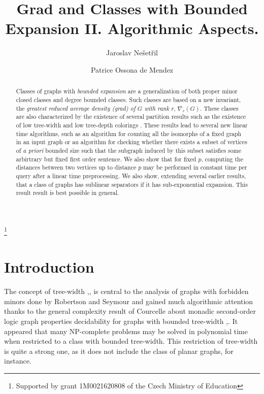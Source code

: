\documentclass[a4paper]{amsart}
\theoremstyle{definition}
\theoremstyle{remark}
\newcommand{\rdens}[1]{\nabla_{#1}}
\begin{document}
\title{Grad  and Classes with Bounded Expansion II. Algorithmic Aspects.}
\author{Jaroslav Ne\v
  set\v ril}
\thanks{Supported by grant 1M0021620808 of the Czech Ministry of Education}
\address{Department of Applied Mathematics\\
  and\\
  Institute of Theoretical Computer Science (ITI)\\
  Charles University\\
  Malostransk\' e n\' am.25, 11800 Praha 1\\
  Czech Republic}  \author{Patrice
  Ossona de Mendez}
\address{Centre d'Analyse et de Math\'ematiques Sociales\\
  CNRS, UMR 8557\\
  54 Bd Raspail, 75006 Paris\\
  France} 
\begin{abstract}
Classes of graphs with {\em bounded expansion} are a
generalization of both proper minor closed classes and degree bounded
classes. Such classes are based on a new invariant, the
{\em greatest reduced average density (grad) of $G$ with rank $r$},
$\rdens{r}(G)$. These classes are also characterized by the existence of several
partition results such as the existence of low tree-width and low
tree-depth colorings \cite{ICGT05}\cite{POMNI}. 
These results lead to several new linear time
algorithms, such as an algorithm for counting all the isomorphs of a
fixed graph in an 
input graph or an algorithm for checking whether there exists a subset
of vertices of 
{\em a priori} bounded size such that the subgraph induced by this
subset satisfies some arbirtrary but fixed first order sentence. We
also show that for fixed $p$, computing the distances between two
vertices up to distance $p$ may be performed in constant time per
query after a linear time preprocessing. We also show, extending
several earlier results, that a class of graphs has
sublinear separators if it has sub-exponential expansion. This result
result is best possible in general.
\end{abstract}

\maketitle
\section{Introduction}
The concept of tree-width \cite{Halin},\cite{GM1},\cite{Wagner} is
central to the analysis of graphs with forbidden minors done by
Robertson and Seymour and gained much algorithmic attention
thanks to the general complexity result of Courcelle about
monadic second-order logic graph properties decidability for graphs
with bounded tree-width \cite{Courcelle1},\cite{Courcelle2}. It
appeared that many NP-complete problems may be solved in polynomial
time when restricted to a class with bounded tree-width.
This restriction of tree-width is quite a strong one, as it 
does not include the class of planar graphs, for instance. 
\end{document}
